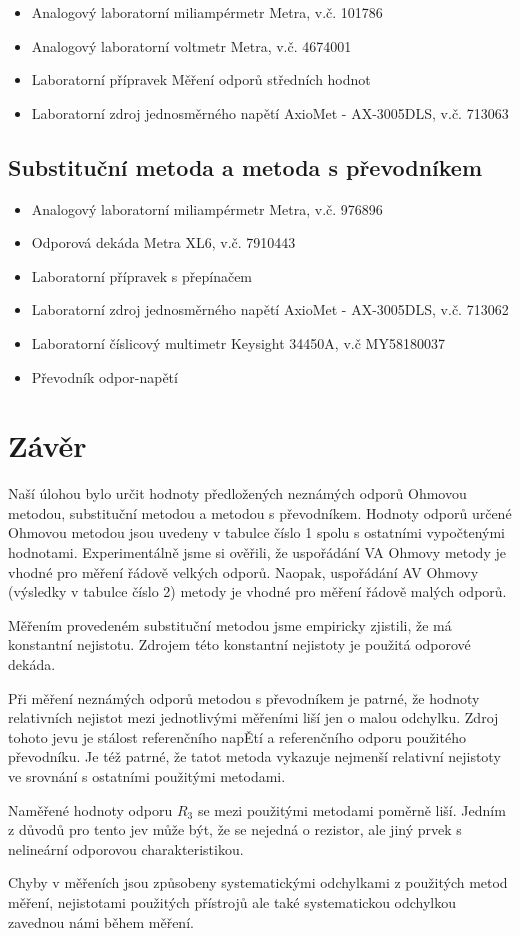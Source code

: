 \documentclass[a4paper, czech]{article}
\begin{document}
\begin{itemize}
    \item Analogový laboratorní miliampérmetr Metra, v.č. 101786
    \item Analogový laboratorní voltmetr Metra, v.č. 4674001
    \item Laboratorní přípravek Měření odporů středních hodnot
    \item Laboratorní zdroj jednosměrného napětí AxioMet - AX-3005DLS, v.č. 713063
\end{itemize}

\subsection{Substituční metoda a metoda s převodníkem}

\begin{itemize}
    \item Analogový laboratorní miliampérmetr Metra, v.č. 976896
    \item Odporová dekáda Metra XL6, v.č. 7910443
    \item Laboratorní přípravek s přepínačem
    \item Laboratorní zdroj jednosměrného napětí AxioMet - AX-3005DLS, v.č. 713062
    \item Laboratorní číslicový multimetr Keysight 34450A, v.č MY58180037
    \item Převodník odpor-napětí
\end{itemize}

\section{Závěr}

Naší úlohou bylo určit hodnoty předložených neznámých odporů Ohmovou metodou, substituční metodou a metodou s převodníkem.
Hodnoty odporů určené Ohmovou metodou jsou uvedeny v tabulce číslo 1 spolu s ostatními vypočtenými hodnotami.
Experimentálně jsme si ověřili, že uspořádání VA Ohmovy metody je vhodné pro měření řádově velkých odporů.
Naopak, uspořádání AV Ohmovy (výsledky v tabulce číslo 2) metody je vhodné pro měření řádově malých odporů.

Měřením provedeném substituční metodou jsme empiricky zjistili, že má konstantní nejistotu.
Zdrojem této konstantní nejistoty je použitá odporové dekáda.

Při měření neznámých odporů metodou s převodníkem je patrné, že hodnoty relativních nejistot mezi jednotlivými měřeními liší jen o malou odchylku.
Zdroj tohoto jevu je stálost referenčního napĚtí a referenčního odporu použitého převodníku.
Je též patrné, že tatot metoda vykazuje nejmenší relativní nejistoty ve srovnání s ostatními použitými metodami.

Naměřené hodnoty odporu $R_3$ se mezi použitými metodami poměrně liší.
Jedním z důvodů pro tento jev může být, že se nejedná o rezistor, ale jiný prvek s nelineární odporovou charakteristikou.

Chyby v měřeních jsou způsobeny systematickými odchylkami z použitých metod měření, nejistotami použitých přístrojů ale také systematickou odchylkou zavednou námi během měření.
\end{document}
